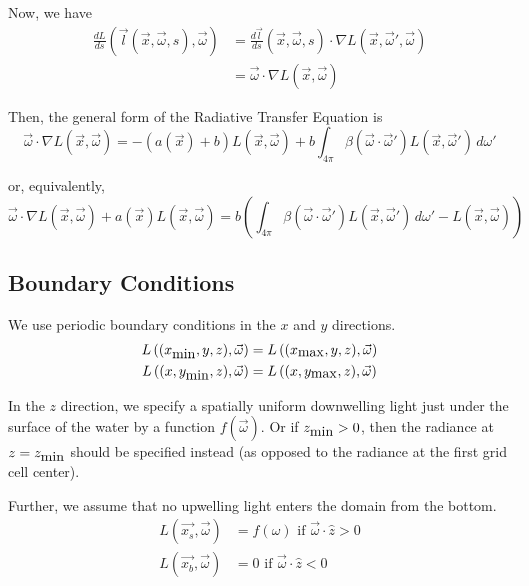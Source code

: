 Now, we have
\begin{align*}
  \frac{dL}{ds}(\vec{l}(\vec{x}, \vec{\omega}, s), \vec{\omega})
    &= \frac{d\vec{l}}{ds}(\vec{x}, \vec{\omega}, s) \cdot \nabla L(\vec{x}, \vec{\omega}', \vec{\omega}) \\
    &= \vec{\omega} \cdot \nabla L(\vec{x}, \vec{\omega})
\end{align*}

Then, the general form of the Radiative Transfer Equation is
\begin{equation}
  \vec{\omega} \cdot \nabla L(\vec{x}, \vec{\omega})
  = -(a(\vec{x}) + b)L(\vec{x}, \vec{\omega})
  + b \int_{4\pi} \beta(\vec{\omega}\cdot\vec{\omega}') L(\vec{x}, \vec{\omega}')\, d\omega'
\end{equation}

or, equivalently,
\begin{equation}
  \vec{\omega} \cdot \nabla L(\vec{x}, \vec{\omega})
  + a(\vec{x})L(\vec{x}, \vec{\omega})
  = b \left(
    \int_{4\pi} \beta(\vec{\omega}\cdot\vec{\omega}') L(\vec{x}, \vec{\omega}')\, d\omega'
    - L(\vec{x}, \vec{\omega})
  \right)
\end{equation}

\subsection{Boundary Conditions}

We use periodic boundary conditions in the $x$ and $y$ directions.
\begin{align}
  L\left((x_{\mbox{min}}, y, z), \vec{\omega}\right) &= L\left((x_{\mbox{max}}, y, z), \vec{\omega}\right) \\
  L\left((x, y_{\mbox{min}}, z), \vec{\omega}\right) &= L\left((x, y_{\mbox{max}}, z), \vec{\omega}\right)
\end{align}

In the $z$ direction, we specify a spatially uniform downwelling light just
under the surface of the water by a function $f(\vec{\omega})$.
Or if $z_{\mbox{min}}>0$, then the radiance at $z=z_{\mbox{min}}$ should be specified instead (as opposed to the radiance at the first grid cell center).

Further, we assume that no upwelling light enters the domain from the bottom.
\begin{align}
  L(\vec{x_s}, \vec{\omega}) &= f(\omega) \mbox{ if } \vec{\omega} \cdot \hat{z} > 0\\ 
  L(\vec{x_b}, \vec{\omega}) &= 0 \mbox { if } \vec{\omega} \cdot \hat{z} < 0
\end{align}
 
